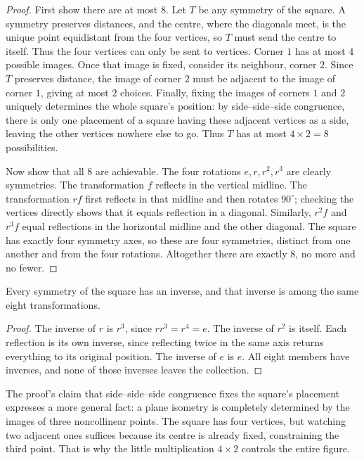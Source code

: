\begin{proof}
First show there are at most $8$. Let $T$ be any symmetry of the square. A symmetry preserves distances, and the centre, where the diagonals meet, is the unique point equidistant from the four vertices, so $T$ must send the centre to itself. Thus the four vertices can only be sent to vertices. Corner $1$ has at most $4$ possible images. Once that image is fixed, consider its neighbour, corner $2$. Since $T$ preserves distance, the image of corner $2$ must be adjacent to the image of corner $1$, giving at most $2$ choices. Finally, fixing the images of corners $1$ and $2$ uniquely determines the whole square's position: by side--side--side congruence, there is only one placement of a square having these adjacent vertices as a side, leaving the other vertices nowhere else to go. Thus $T$ has at most $4\times2=8$ possibilities.

Now show that all $8$ are achievable. The four rotations $e,r,r^2,r^3$ are clearly symmetries. The transformation $f$ reflects in the vertical midline. The transformation $rf$ first reflects in that midline and then rotates $90^\circ$; checking the vertices directly shows that it equals reflection in a diagonal. Similarly, $r^2f$ and $r^3f$ equal reflections in the horizontal midline and the other diagonal. The square has exactly four symmetry axes, so these are four symmetries, distinct from one another and from the four rotations. Altogether there are exactly $8$, no more and no fewer.
\end{proof}

\begin{tuilun}
Every symmetry of the square has an inverse, and that inverse is among the same eight transformations.
\end{tuilun}

\begin{proof}
The inverse of $r$ is $r^3$, since $rr^3=r^4=e$. The inverse of $r^2$ is itself. Each reflection is its own inverse, since reflecting twice in the same axis returns everything to its original position. The inverse of $e$ is $e$. All eight members have inverses, and none of those inverses leaves the collection.
\end{proof}

\begin{zhu}
The proof's claim that side--side--side congruence fixes the square's placement expresses a more general fact: a plane isometry is completely determined by the images of three noncollinear points. The square has four vertices, but watching two adjacent ones suffices because its centre is already fixed, constraining the third point. That is why the little multiplication $4\times2$ controls the entire figure.
\end{zhu}


